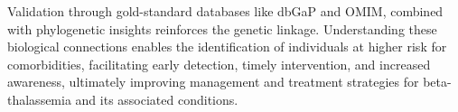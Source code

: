 Validation through gold-standard databases like dbGaP and OMIM, combined with phylogenetic insights reinforces the genetic linkage. Understanding these biological connections enables the identification of individuals at higher risk for comorbidities, facilitating early detection, timely intervention, and increased awareness, ultimately improving management and treatment strategies for beta-thalassemia and its associated conditions.